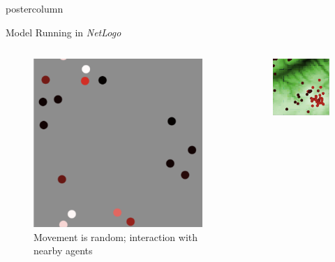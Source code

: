 \documentclass[final,hyperref={pdfpagelabels=false}]{beamer}
\begin{document}
\begin{frame}
\begin{columns}[T]
\begin{column}{.33\textwidth}
\begin{beamercolorbox}[center,wd=\textwidth]{postercolumn}
\begin{minipage}[T]{.95\textwidth}
{\begin{block}{Model Running in \textit{NetLogo}}
\begin{columns}[T]
\begin{column}{.32\textwidth}
\begin{figure}[h!]
                    \includegraphics[width=\linewidth]{images/random_movement}
                    \caption{Movement is random; interaction with nearby agents}
                    \end{figure}
                  \end{column}             
                  \begin{column}{.32\textwidth}
                    \begin{figure}[h!]
                      \includegraphics[width=\linewidth]{images/netlogo}

\end{figure}
\end{column}
\end{columns}
\end{block}}
\end{minipage}
\end{beamercolorbox}
\end{column}
\end{columns}
\end{frame}
\end{document}
